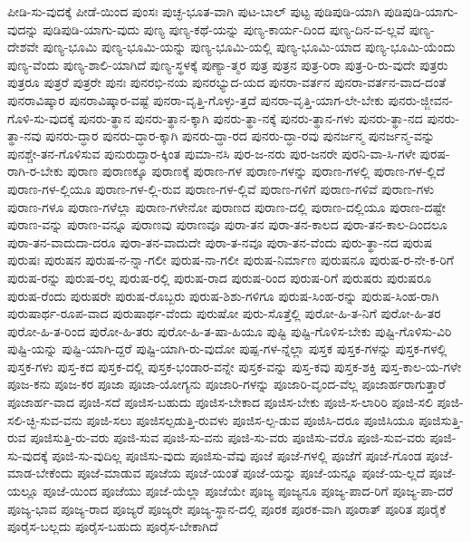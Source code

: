 {ಪೀಡಿ-ಸು-ವುದಕ್ಕೆ
ಪೀಡೆ-ಯಿಂದ
ಪುಂಸಃ
ಪುಚ್ಛ-ಭೂತ-ವಾಗಿ
ಪುಟ-ಬಾಲ್
ಪುಟ್ಟ
ಪುಡಿಪುಡಿ-ಯಾಗಿ
ಪುಡಿಪುಡಿ-ಯಾಗು-ವುದನ್ನು
ಪುಡಿಪುಡಿ-ಯಾಗು-ವುದು
ಪುಣ್ಯ
ಪುಣ್ಯ-ಕಥೆ-ಯನ್ನು
ಪುಣ್ಯ-ಕಾರ್ಯ-ದಿಂದ
ಪುಣ್ಯ-ದಿನ-ವ-ಲ್ಲವೆ
ಪುಣ್ಯ-ದೇಶವೇ
ಪುಣ್ಯ-ಭೂಮಿ
ಪುಣ್ಯ-ಭೂಮಿ-ಯನ್ನು
ಪುಣ್ಯ-ಭೂಮಿ-ಯಲ್ಲಿ
ಪುಣ್ಯ-ಭೂಮಿ-ಯಾದ
ಪುಣ್ಯ-ಭೂಮಿ-ಯೆಂದು
ಪುಣ್ಯ-ವೆಂದು
ಪುಣ್ಯ-ಶಾಲಿ-ಯಾಗಿದೆ
ಪುಣ್ಯ-ಸ್ಥಳಕ್ಕೆ
ಪುಣ್ಯಾ-ತ್ಮರ
ಪುತ್ರ
ಪುತ್ರನ
ಪುತ್ರ-ರಿರಾ
ಪುತ್ರ-ರಿ-ರು-ವುದೇ
ಪುತ್ರರು
ಪುತ್ರರೂ
ಪುತ್ರರೆ
ಪುತ್ರರೇ
ಪುನಃ
ಪುನರಭಿ-ನಯ
ಪುನರಭ್ಯುದ-ಯದ
ಪುನರಾ-ವರ್ತನ
ಪುನರಾ-ವರ್ತನ-ವಾದ-ದಂತೆ
ಪುನರಾವಿಷ್ಕಾರ
ಪುನರಾವಿಷ್ಕಾರ-ವಷ್ಟೆ
ಪುನರಾ-ವೃತ್ತಿ-ಗೊಳ್ಳು-ತ್ತದೆ
ಪುನರಾ-ವೃತ್ತಿ-ಯಾಗ-ಲೇ-ಬೇಕು
ಪುನರು-ಜ್ಜೀವನ-ಗೊಳಿ-ಸು-ವುದಕ್ಕೆ
ಪುನರು-ತ್ಥಾನ
ಪುನರು-ತ್ಥಾನ-ಕ್ಕಾಗಿ
ಪುನರು-ತ್ಥಾ-ನಕ್ಕೆ
ಪುನರು-ತ್ಥಾನ-ಗಳು
ಪುನರು-ತ್ಥಾ-ನದ
ಪುನರು-ತ್ಥಾ-ನವು
ಪುನರು-ದ್ಧಾರ
ಪುನರು-ದ್ಧಾರ-ಕ್ಕಾಗಿ
ಪುನರು-ದ್ಧಾ-ರದ
ಪುನರು-ದ್ಧಾ-ರವು
ಪುನರ್ಜನ್ಮ
ಪುನರ್ಜನ್ಮ-ವನ್ನು
ಪುನಶ್ಚೇ-ತನ-ಗೊಳಿಸುವ
ಪುನುರುದ್ಧಾರ-ಕ್ಕಿಂತ
ಪುಮಾ-ನಸಿ
ಪುರ-ಜ-ನರು
ಪುರ-ಜನರೇ
ಪುರನಿ-ವಾ-ಸಿ-ಗಳೇ
ಪುರಷ-ರಾಗಿ-ರ-ಬೇಕು
ಪುರಾಣ
ಪುರಾಣಕ್ಕೂ
ಪುರಾಣಕ್ಕೆ
ಪುರಾಣ-ಗಳ
ಪುರಾಣ-ಗಳನ್ನು
ಪುರಾಣ-ಗಳಲ್ಲಿ
ಪುರಾಣ-ಗಳ-ಲ್ಲಿದೆ
ಪುರಾಣ-ಗಳ-ಲ್ಲಿಯೂ
ಪುರಾಣ-ಗಳ-ಲ್ಲಿ-ರುವ
ಪುರಾಣ-ಗಳ-ಲ್ಲಿವೆ
ಪುರಾಣ-ಗಳಿಗೆ
ಪುರಾಣ-ಗಳಿವೆ
ಪುರಾಣ-ಗಳು
ಪುರಾಣ-ಗಳೂ
ಪುರಾಣ-ಗಳೆಲ್ಲಾ
ಪುರಾಣ-ಗಳೇನೋ
ಪುರಾಣದ
ಪುರಾಣ-ದಲ್ಲಿ
ಪುರಾಣ-ದಲ್ಲಿಯೂ
ಪುರಾಣ-ದಷ್ಟೇ
ಪುರಾಣ-ವನ್ನು
ಪುರಾಣ-ವನ್ನೂ
ಪುರಾಣವು
ಪುರಾಣವೂ
ಪುರಾ-ತನ
ಪುರಾ-ತನ-ಕಾಲದ
ಪುರಾ-ತನ-ಕಾಲ-ದಿಂದಲೂ
ಪುರಾ-ತನ-ವಾದುದಾ-ದರೂ
ಪುರಾ-ತನ-ವಾದುದೇ
ಪುರಾ-ತ-ನವೂ
ಪುರಾ-ತನ-ವೆಂದು
ಪುರು-ತ್ಥಾ-ನದ
ಪುರುಷ
ಪುರುಷಃ
ಪುರುಷನ
ಪುರುಷ-ನ-ನ್ನಾ-ಗಲೀ
ಪುರುಷ-ನಾ-ಗಲೀ
ಪುರುಷ-ನಿರ್ಮಾಣ
ಪುರುಷನೂ
ಪುರುಷ-ರ-ನೇ-ಕ-ರಿಗೆ
ಪುರುಷ-ರನ್ನು
ಪುರುಷ-ರಲ್ಲ
ಪುರುಷ-ರಲ್ಲಿ
ಪುರುಷ-ರಾದ
ಪುರುಷ-ರಿಂದ
ಪುರುಷ-ರಿಗೆ
ಪುರುಷರು
ಪುರುಷರೂ
ಪುರುಷ-ರೆಂದು
ಪುರುಷರೇ
ಪುರುಷ-ರೊಬ್ಬರು
ಪುರುಷ-ಶಿಶು-ಗಳಿಗೂ
ಪುರುಷ-ಸಿಂಹ-ರನ್ನು
ಪುರುಷ-ಸಿಂಹ-ರಾಗಿ
ಪುರುಷಾರ್ಥ-ರೂಪ-ವಾದ
ಪುರುಷಾರ್ಥ-ವೆಂದು
ಪುರುಷೋ
ಪುರು-ಸೊತ್ತೆಲ್ಲಿ
ಪುರೋ-ಹಿ-ತ-ನಿಗೆ
ಪುರೋ-ಹಿ-ತರ
ಪುರೋ-ಹಿ-ತ-ರಿಂದ
ಪುರೋ-ಹಿ-ತರು
ಪುರೋ-ಹಿ-ತ-ಷಾ-ಹಿಯೂ
ಪುಷ್ಟಿ
ಪುಷ್ಟಿ-ಗೊಳಿಸ-ಬೇಕು
ಪುಷ್ಟಿ-ಗೊಳಿಸು-ವಿರಿ
ಪುಷ್ಟಿ-ಯನ್ನು
ಪುಷ್ಟಿ-ಯಾಗಿ-ದ್ದರೆ
ಪುಷ್ಟಿ-ಯಾಗಿ-ರು-ವುದೋ
ಪುಷ್ಪ-ಗಳ-ನ್ನೆಲ್ಲಾ
ಪುಸ್ತಕ
ಪುಸ್ತಕ-ಗಳನ್ನು
ಪುಸ್ತಕ-ಗಳಲ್ಲಿ
ಪುಸ್ತಕ-ಗಳು
ಪುಸ್ತ-ಕದ
ಪುಸ್ತಕ-ದಲ್ಲಿ
ಪುಸ್ತಕ-ಭಂಡಾರ-ವನ್ನೇ
ಪುಸ್ತಕ-ವನ್ನು
ಪುಸ್ತ-ಕವು
ಪುಸ್ತಕ-ಶಕ್ತಿ
ಪುಸ್ತ-ಕಾಲ-ಯ-ಗಳೇ
ಪೂಜ-ಕನು
ಪೂಜ-ಕರ
ಪೂಜಾ
ಪೂಜಾ-ಯೋಗ್ಯನು
ಪೂಜಾರಿ-ಗಳನ್ನು
ಪೂಜಾರಿ-ವೃಂದ-ವೆಲ್ಲ
ಪೂಜಾರ್ಹರಾಗುತ್ತಾರೆ
ಪೂಜಾರ್ಹ-ವಾದ
ಪೂಜಿ-ಸದೆ
ಪೂಜಿಸ-ಬಹುದು
ಪೂಜಿಸ-ಬೇಕಾದ
ಪೂಜಿಸ-ಬೇಕು
ಪೂಜಿ-ಸ-ಲಾರಿರಿ
ಪೂಜಿ-ಸಲಿ
ಪೂಜಿ-ಸಲಿ-ಚ್ಛಿ-ಸುವ-ವನು
ಪೂಜಿ-ಸಲು
ಪೂಜಿಸಲ್ಪಡುತ್ತಿ-ರುವಳು
ಪೂಜಿಸ-ಲ್ಪ-ಡುವ
ಪೂಜಿಸಿ-ದರೂ
ಪೂಜಿಸಿಯೂ
ಪೂಜಿಸುತ್ತಿ-ರುವ
ಪೂಜಿಸುತ್ತಿ-ರು-ವರು
ಪೂಜಿ-ಸುವ
ಪೂಜಿ-ಸು-ವನು
ಪೂಜಿ-ಸು-ವರು
ಪೂಜಿಸು-ವರೊ
ಪೂಜಿ-ಸುವ-ವರು
ಪೂಜಿ-ಸು-ವುದಕ್ಕೆ
ಪೂಜಿ-ಸು-ವುದಿಲ್ಲ
ಪೂಜಿಸು-ವುದು
ಪೂಜಿಸು-ವೆವು
ಪೂಜೆ
ಪೂಜೆ-ಗಳಲ್ಲಿ
ಪೂಜೆಗೆ
ಪೂಜೆ-ಗೊಂಡ
ಪೂಜೆ-ಮಾಡ-ಬೇಕೆಂದು
ಪೂಜೆ-ಮಾಡುವ
ಪೂಜೆಯ
ಪೂಜೆ-ಯಂತೆ
ಪೂಜೆ-ಯನ್ನು
ಪೂಜೆ-ಯನ್ನೂ
ಪೂಜೆ-ಯ-ಲ್ಲದೆ
ಪೂಜೆ-ಯಲ್ಲೂ
ಪೂಜೆ-ಯಿಂದ
ಪೂಜೆಯು
ಪೂಜೆ-ಯೆಲ್ಲಾ
ಪೂಜೆಯೇ
ಪೂಜ್ಯ
ಪೂಜ್ಯನೂ
ಪೂಜ್ಯ-ಪಾದ-ರಿಗೆ
ಪೂಜ್ಯ-ಪಾ-ದರೆ
ಪೂಜ್ಯ-ಭಾವ
ಪೂಜ್ಯ-ರಾದ
ಪೂಜ್ಯರೆ
ಪೂಜ್ಯರೇ
ಪೂಜ್ಯ-ಸ್ಥಾನ-ದಲ್ಲಿ
ಪೂರಕ
ಪೂರಕ-ವಾಗಿ
ಪೂರಾತ್
ಪೂರಿತ
ಪೂರೈಕೆ
ಪೂರೈಸ-ಬಲ್ಲದು
ಪೂರೈಸ-ಬಹುದು
ಪೂರೈಸ-ಬೇಕಾಗಿದೆ
}
